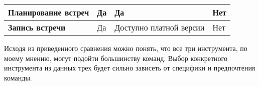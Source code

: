 \documentclass[a4paper, 14pt]{extarticle}
\begin{document}
{\begin{longtable}{|C{0.28\textwidth}|C{0.21\textwidth}|C{0.21\textwidth}|C{0.21\textwidth}|}
  \hline
  \textbf{Планирование встреч}                                          & Да                                                                                                   & Да                                                                                                & Нет                                                                                                                 \\
  \hline
  \textbf{Запись встречи}                                               & Да                                                                                                   & Доступно платной версии                                                                           & Нет                                                                                                                 \\
  \hline
\end{longtable}
}

Исходя из приведенного сравнения можно понять, что все три инструмента, по
моему мнению, могут подойти большинству команд. Выбор конкретного инструмента
из данных трех будет сильно зависеть от специфики и предпочтения команды.
\end{document}
